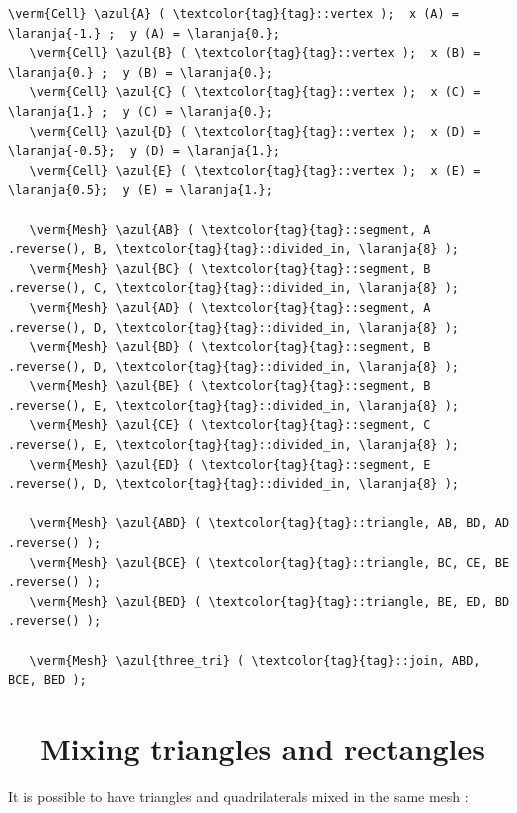 \begin{Verbatim}[commandchars=\\\{\},formatcom=\small\tt,frame=single,
   label=parag-\ref{\numb section 1.\numb parag 5}.cpp,rulecolor=\color{coment},
   baselinestretch=0.94,framesep=2mm]
   \verm{Cell} \azul{A} ( \textcolor{tag}{tag}::vertex );  x (A) = \laranja{-1.} ;  y (A) = \laranja{0.};
   \verm{Cell} \azul{B} ( \textcolor{tag}{tag}::vertex );  x (B) =  \laranja{0.} ;  y (B) = \laranja{0.};
   \verm{Cell} \azul{C} ( \textcolor{tag}{tag}::vertex );  x (C) =  \laranja{1.} ;  y (C) = \laranja{0.};
   \verm{Cell} \azul{D} ( \textcolor{tag}{tag}::vertex );  x (D) = \laranja{-0.5};  y (D) = \laranja{1.};
   \verm{Cell} \azul{E} ( \textcolor{tag}{tag}::vertex );  x (E) =  \laranja{0.5};  y (E) = \laranja{1.};

   \verm{Mesh} \azul{AB} ( \textcolor{tag}{tag}::segment, A .reverse(), B, \textcolor{tag}{tag}::divided_in, \laranja{8} );
   \verm{Mesh} \azul{BC} ( \textcolor{tag}{tag}::segment, B .reverse(), C, \textcolor{tag}{tag}::divided_in, \laranja{8} );
   \verm{Mesh} \azul{AD} ( \textcolor{tag}{tag}::segment, A .reverse(), D, \textcolor{tag}{tag}::divided_in, \laranja{8} );
   \verm{Mesh} \azul{BD} ( \textcolor{tag}{tag}::segment, B .reverse(), D, \textcolor{tag}{tag}::divided_in, \laranja{8} );
   \verm{Mesh} \azul{BE} ( \textcolor{tag}{tag}::segment, B .reverse(), E, \textcolor{tag}{tag}::divided_in, \laranja{8} );
   \verm{Mesh} \azul{CE} ( \textcolor{tag}{tag}::segment, C .reverse(), E, \textcolor{tag}{tag}::divided_in, \laranja{8} );
   \verm{Mesh} \azul{ED} ( \textcolor{tag}{tag}::segment, E .reverse(), D, \textcolor{tag}{tag}::divided_in, \laranja{8} );

   \verm{Mesh} \azul{ABD} ( \textcolor{tag}{tag}::triangle, AB, BD, AD .reverse() );
   \verm{Mesh} \azul{BCE} ( \textcolor{tag}{tag}::triangle, BC, CE, BE .reverse() );
   \verm{Mesh} \azul{BED} ( \textcolor{tag}{tag}::triangle, BE, ED, BD .reverse() );

   \verm{Mesh} \azul{three_tri} ( \textcolor{tag}{tag}::join, ABD, BCE, BED );
\end{Verbatim}


\section{~~Mixing triangles and rectangles}\label{\numb section 1.\numb parag 6}

It is possible to have triangles and quadrilaterals mixed in the same mesh :

